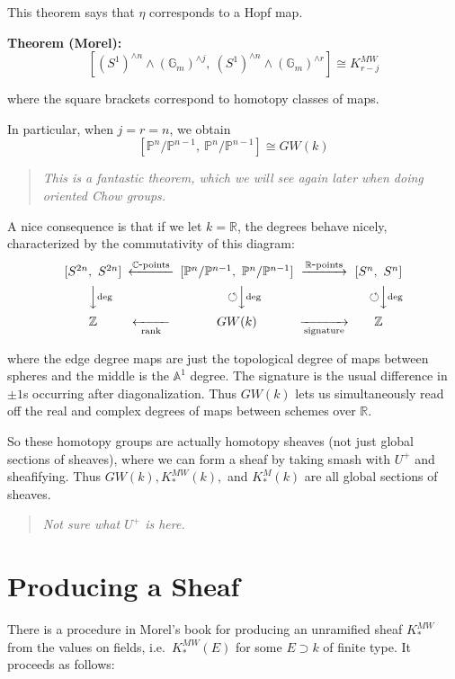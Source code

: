 \documentclass[11pt]{scrreprt}
\theoremstyle{definition}
\newcommand{\RR}[0]{{\mathbb{R}}}
\newcommand{\ZZ}[0]{{\mathbb{Z}}}
\newcommand{\CC}[0]{{\mathbb{C}}}
\newcommand{\PP}[0]{{\mathbb{P}}}
\newcommand{\Af}[0]{{\mathbb{A}}}
\newcommand{\selfmap}[0]{{\circlearrowleft}}
\newcommand{\dash}[0]{{\hbox{-}}}
\newcommand{\GG}[0]{{\mathbb{G}}}
\begin{document}
This theorem says that \(\eta\) corresponds to a Hopf map.

\textbf{Theorem (Morel):} \[
[(S^1)^{\wedge n} \wedge (\GG_m)^{\wedge j},~ (S^1)^{\wedge n} \wedge (\GG_m)^{\wedge r}] \cong K^{MW}_{r-j}
\]

where the square brackets correspond to homotopy classes of maps.

In particular, when \(j=r=n\), we obtain \[
[\PP^n /\PP^{n-1},~ \PP^n /\PP^{n-1}] \cong GW(k)
\]

\begin{quote}\textit{
This is a fantastic theorem, which we will see again later when doing
oriented Chow groups.
}\end{quote}

A nice consequence is that if we let \(k=\RR\), the degrees behave
nicely, characterized by the commutativity of this diagram: \[
\begin{CD}
[S^{2n},~S^{2n}] @<\CC\dash\text{points}<< [\PP^n /\PP^{n-1},~ \PP^n /\PP^{n-1}] @>\RR\dash\text{points}>> [S^n,~S^n] \\
@VV\deg V \selfmap @VV\deg V \selfmap @VV\deg V \\
\ZZ @<<\text{rank}< GW(k) @>>\text{signature}> \ZZ
\end{CD}
\]

where the edge degree maps are just the topological degree of maps
between spheres and the middle is the \(\Af^1\) degree. The signature is
the usual difference in \(\pm 1\)s occurring after diagonalization. Thus
\(GW(k)\) lets us simultaneously read off the real and complex degrees
of maps between schemes over \(\RR\).

So these homotopy groups are actually homotopy sheaves (not just global
sections of sheaves), where we can form a sheaf by taking smash with
\(U^+\) and sheafifying. Thus \(GW(k), K^{MW}_*(k),\) and \(K^M_*(k)\)
are all global sections of sheaves.

\begin{quote}\textit{
Not sure what \(U^+\) is here.
}\end{quote}

\hypertarget{producing-a-sheaf}{%
\section{Producing a Sheaf}\label{producing-a-sheaf}}

There is a procedure in Morel's book for producing an unramified sheaf
\(K^{MW}_*\) from the values on fields, i.e.~\(K^{MW}_*(E)\) for some
\(E \supset k\) of finite type. It proceeds as follows:
\end{document}
